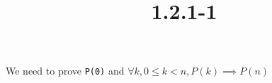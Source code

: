 \documentclass{article}
\title{1.2.1-1}
\begin{document}
\maketitle

We need to prove \texttt{P(0)} and $\forall k, 0 \leq k < n, P(k) \implies P(n)$
\end{document}
